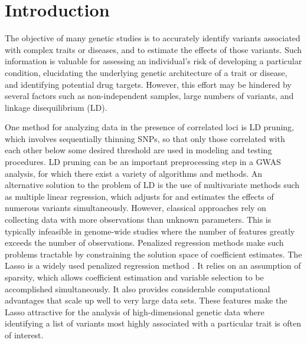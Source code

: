 
\section{Introduction}

The objective of many genetic studies is to accurately identify variants associated with complex traits or diseases, and to estimate the effects of those variants. Such information is valuable for assessing an individual's risk of developing a particular condition, elucidating the underlying genetic architecture of a trait or disease, and identifying potential drug targets. However, this effort may be hindered by several factors such as non-independent samples, large numbers of variants, and linkage disequilibrium (LD). 


One method for analyzing data in the presence of correlated loci is LD pruning, which involves sequentially thinning SNPs, so that only those correlated with each other below some desired threshold are used in modeling and testing procedures. LD pruning can be an important preprocessing step in a GWAS analysis, for which there exist a variety of algorithms and methods. An alternative solution to the problem of LD is the use of multivariate methods such as multiple linear regression, which adjusts for and estimates the effects of numerous variants simultaneously. However, classical approaches rely on collecting data with more observations than unknown parameters. This is typically infeasible in genome-wide studies where the number of features greatly exceeds the number of observations. Penalized regression methods make such problems tractable by constraining the solution space of coefficient estimates. The Lasso is a widely used penalized regression method \citep{tibshirani1996regression}. It relies on an assumption of sparsity, which allows coefficient estimation and variable selection to be accomplished simultaneously. It also provides considerable computational advantages that scale up well to very large data sets. These features make the Lasso attractive for the analysis of high-dimensional genetic data where identifying a list of variants most highly associated with a particular trait is often of interest.

